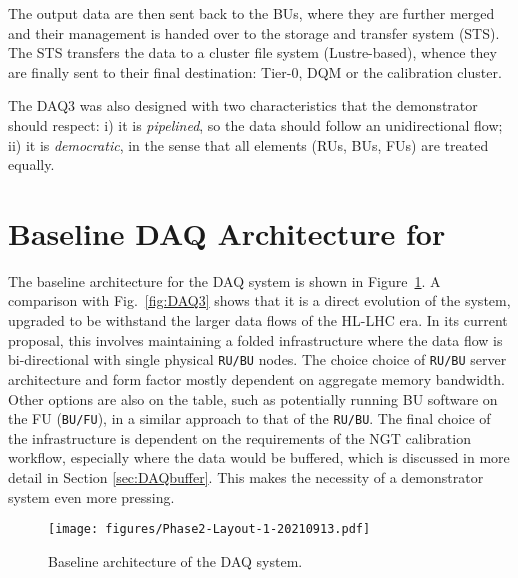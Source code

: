 The output data are then sent back to the BUs, where they are further merged and their management is handed over to the storage and transfer system (STS). The STS  transfers the data to a cluster file system (Lustre-based), whence they are finally sent to their final destination: Tier-0, DQM or the calibration cluster.

The DAQ3 was also designed with two characteristics that the demonstrator should respect: 
i) it is \emph{pipelined}, so the data should follow an unidirectional flow;
ii) it is \emph{democratic}, in the sense that all elements (RUs, BUs, FUs) are treated equally.

\section{Baseline DAQ Architecture for \Phasetwo}\label{sec:DAQP2}
The baseline architecture for  the \Phasetwo DAQ system is shown in Figure~\ref{fig:DAQP2}. A comparison with Fig.~\ref{fig:DAQ3} shows that it is a direct evolution of the \Runthree system, upgraded to be withstand the larger data flows of the HL-LHC era. In its current proposal, this involves maintaining a folded infrastructure where the data flow is bi-directional with single physical \texttt{RU/BU} nodes. The choice choice of \texttt{RU/BU} server architecture and form factor mostly dependent on aggregate memory bandwidth. Other options are also on the table, such as potentially running BU software on the FU (\texttt{BU/FU}), in a similar approach to that of the \texttt{RU/BU}. The final choice of the infrastructure is dependent on the requirements of the NGT calibration workflow, especially where the data would be buffered, which is discussed in more detail in Section \ref{sec:DAQbuffer}. This makes the necessity of a demonstrator system even more pressing.

\begin{figure}[htbp]
   \centering
	\texttt{[image: figures/Phase2-Layout-1-20210913.pdf]}
  \caption{Baseline architecture of the \Phasetwo DAQ system.}
   \label{fig:DAQP2}
\end{figure}

